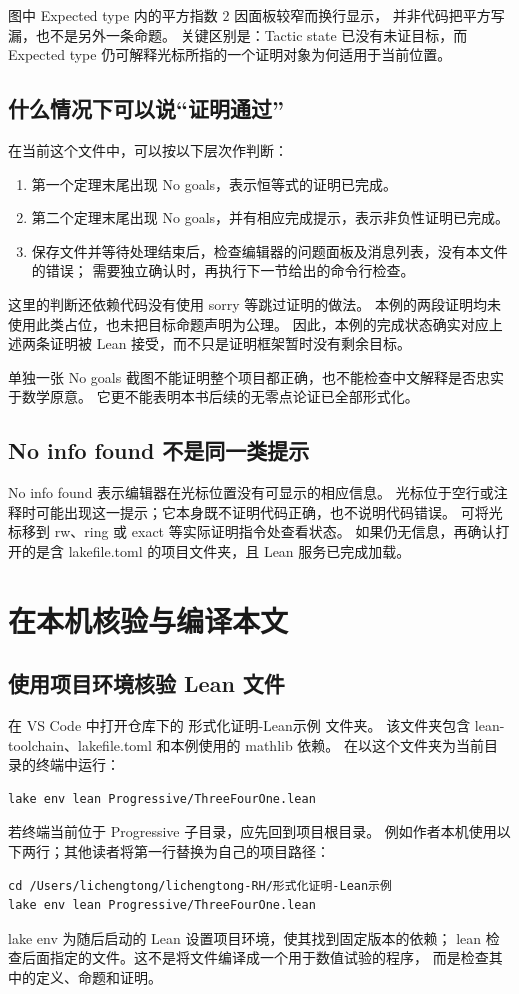 \documentclass[UTF8,fontset=fandol,a4paper,11pt]{ctexart}
\newcommand{\code}[1]{{\small\ttfamily\def\_{\textunderscore\allowbreak}#1}}
\newcommand{\step}[1]{\Needspace{7\baselineskip}\subsection{#1}}
\begin{document}
图中 \code{Expected type} 内的平方指数 $2$ 因面板较窄而换行显示，
并非代码把平方写漏，也不是另外一条命题。
关键区别是：\code{Tactic state} 已没有未证目标，而 \code{Expected type}
仍可解释光标所指的一个证明对象为何适用于当前位置。

\step{什么情况下可以说“证明通过”}
在当前这个文件中，可以按以下层次作判断：
\begin{enumerate}
  \item 第一个定理末尾出现 \code{No goals}，表示恒等式的证明已完成。
  \item 第二个定理末尾出现 \code{No goals}，并有相应完成提示，表示非负性证明已完成。
  \item 保存文件并等待处理结束后，检查编辑器的问题面板及消息列表，没有本文件的错误；
    需要独立确认时，再执行下一节给出的命令行检查。
\end{enumerate}
这里的判断还依赖代码没有使用 \code{sorry} 等跳过证明的做法。
本例的两段证明均未使用此类占位，也未把目标命题声明为公理。
因此，本例的完成状态确实对应上述两条证明被 Lean 接受，而不只是证明框架暂时没有剩余目标。

单独一张 \code{No goals} 截图不能证明整个项目都正确，也不能检查中文解释是否忠实于数学原意。
它更不能表明本书后续的无零点论证已全部形式化。

\step{\code{No info found} 不是同一类提示}
\code{No info found} 表示编辑器在光标位置没有可显示的相应信息。
光标位于空行或注释时可能出现这一提示；它本身既不证明代码正确，也不说明代码错误。
可将光标移到 \code{rw}、\code{ring} 或 \code{exact} 等实际证明指令处查看状态。
如果仍无信息，再确认打开的是含 \code{lakefile.toml} 的项目文件夹，且 Lean 服务已完成加载。

\section{在本机核验与编译本文}

\step{使用项目环境核验 Lean 文件}
在 VS Code 中打开仓库下的 \code{形式化证明-Lean示例} 文件夹。
该文件夹包含 \code{lean-toolchain}、\code{lakefile.toml} 和本例使用的 mathlib 依赖。
在以这个文件夹为当前目录的终端中运行：
\begin{Verbatim}
lake env lean Progressive/ThreeFourOne.lean
\end{Verbatim}
若终端当前位于 \code{Progressive} 子目录，应先回到项目根目录。
例如作者本机使用以下两行；其他读者将第一行替换为自己的项目路径：
\begin{Verbatim}
cd /Users/lichengtong/lichengtong-RH/形式化证明-Lean示例
lake env lean Progressive/ThreeFourOne.lean
\end{Verbatim}
\code{lake env} 为随后启动的 Lean 设置项目环境，使其找到固定版本的依赖；
\code{lean} 检查后面指定的文件。这不是将文件编译成一个用于数值试验的程序，
而是检查其中的定义、命题和证明。
\end{document}
